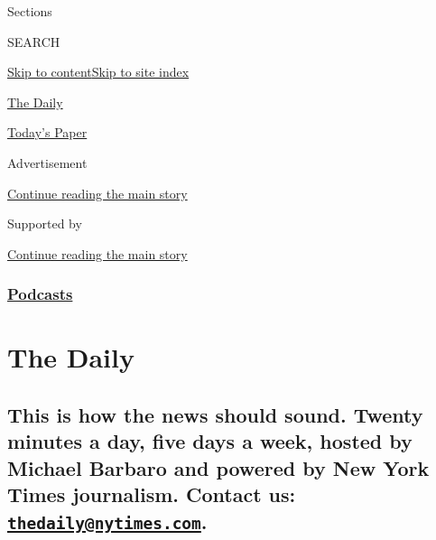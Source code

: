Sections

SEARCH

\protect\hyperlink{site-content}{Skip to
content}\protect\hyperlink{site-index}{Skip to site index}

\href{https://www.nytimes.com/column/the-daily}{The Daily}

\href{https://myaccount.nytimes.com/auth/login?response_type=cookie\&client_id=vi}{}

\href{https://www.nytimes.com/section/todayspaper}{Today's Paper}

Advertisement

\protect\hyperlink{after-top}{Continue reading the main story}

Supported by

\protect\hyperlink{after-sponsor}{Continue reading the main story}

\hypertarget{podcasts}{%
\subsubsection{\texorpdfstring{\href{/spotlight/podcasts}{Podcasts}}{Podcasts}}\label{podcasts}}

\hypertarget{the-daily}{%
\section{The Daily}\label{the-daily}}

\hypertarget{this-is-how-the-news-should-sound-twenty-minutes-a-day-five-days-a-week-hosted-by-michael-barbaro-and-powered-by-new-york-times-journalism-contact-us-thedailynytimescom}{%
\subsection{\texorpdfstring{This is how the news should sound. Twenty
minutes a day, five days a week, hosted by Michael Barbaro and powered
by New York Times journalism. Contact us:
\href{mailto:thedaily@nytimes.com}{\nolinkurl{thedaily@nytimes.com}}.}{This is how the news should sound. Twenty minutes a day, five days a week, hosted by Michael Barbaro and powered by New York Times journalism. Contact us: thedaily@nytimes.com.}}\label{this-is-how-the-news-should-sound-twenty-minutes-a-day-five-days-a-week-hosted-by-michael-barbaro-and-powered-by-new-york-times-journalism-contact-us-thedailynytimescom}}

